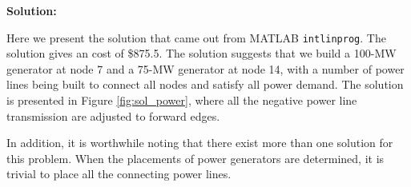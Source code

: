 \textbf{Solution:}\par

Here we present the solution that came out from MATLAB \texttt{intlinprog}. The solution gives an cost of \$875.5. The solution suggests that we build a 100-MW generator at node 7 and a 75-MW generator at node 14, with a number of power lines being built to connect all nodes and satisfy all power demand. The solution is presented in Figure \ref{fig:sol_power}, where all the negative power line transmission are adjusted to forward edges. 

In addition, it is worthwhile noting that there exist more than one solution for this problem. When the placements of power generators are determined, it is trivial to place all the connecting power lines.

